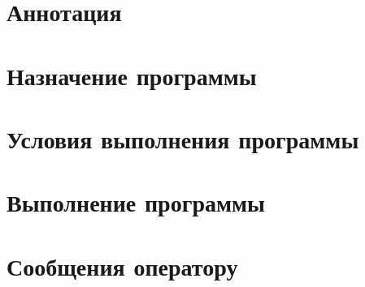 \documentclass[11pt]{article}
\begin{document}
        


\newpage
\section{Аннотация}

\newpage
\tableofcontents

\newpage
\section{Назначение программы}

\newpage
\section{Условия выполнения программы}

\newpage
\section{Выполнение программы}

\newpage
\section{Сообщения оператору}
\end{document}
